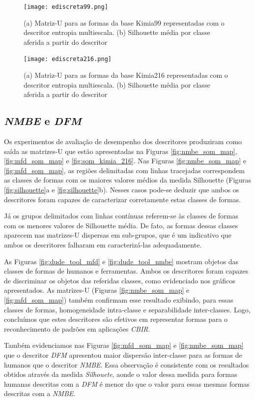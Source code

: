 \begin{figure}
 \caption{\label{fig:edis99} (a) Matriz-U para as formas da base Kimia99 representadas com o descritor entropia multiescala. (b) Silhouette média por classe aferida a partir do descritor}
  \centering
  \texttt{[image: ediscreta99.png]}
\end{figure}

\begin{figure}
 \caption{\label{fig:edis216} (a) Matriz-U para as formas da base Kimia216 representadas com o descritor entropia multiescala. (b) Silhouette média por classe aferida a partir do descritor}
  \centering
  \texttt{[image: ediscreta216.png]}
\end{figure}

\subsection{\emph{NMBE} e \emph{DFM}}
Os experimentos de avaliação de desempenho dos descritores produziram como saída as matrizes-U que estão apresentadas na Figuras \ref{fig:nmbe_som_map}, \ref{fig:mfd_som_map} e  \ref{fig:som_kimia_216}. Nas Figuras \ref{fig:nmbe_som_map} e \ref{fig:mfd_som_map}, as regiões delimitadas com linhas tracejadas correspondem as classes de formas com os maiores valores médios da medida Silhouette (Figuras \ref{fig:silhouette}a e \ref{fig:silhouette}b). Nesses casos pode-se deduzir que ambos os descritores foram capazes de caracterizar corretamente estas classes de formas.

Já os grupos delimitados com linhas contínuas referem-se às classes de formas com os menores valores de Silhouette média. De fato, as formas dessas classes aparecem nas matrizes-U dispersas em sub-grupos, que é um indicativo que ambos os descritores falharam em caracterizá-las adequadamente.
  
As Figuras \ref{fig:dude_tool_mfd} e \ref{fig:dude_tool_nmbe} mostram objetos das classes de formas de humanos e ferramentas. Ambos os descritores foram capazes de discriminar os objetos das referidas classes, como evidenciado nos gráficos apresentados. As matrizes-U (Figuras \ref{fig:nmbe_som_map} e \ref{fig:mfd_som_map}) também confirmam esse resultado exibindo, para essas classes de formas, homogeneidade intra-classe e separabilidade inter-classes. Logo, concluímos que estes descritores são efetivos em representar formas para o reconhecimento de padrões em aplicações \emph{CBIR}.

Também evidenciamos nas Figuras \ref{fig:mfd_som_map} e \ref{fig:nmbe_som_map} que o descritor \emph{DFM} apresentou maior dispersão inter-classe para as formas de humanos que o descritor \emph{NMBE}. Essa observação é consistente com os resultados obtidos através da medida \emph{Silhouete}, aonde o valor dessa medida para formas humanas descritas com a \emph{DFM} é menor do que o valor para essas mesmas formas descritas com a \emph{NMBE}.

